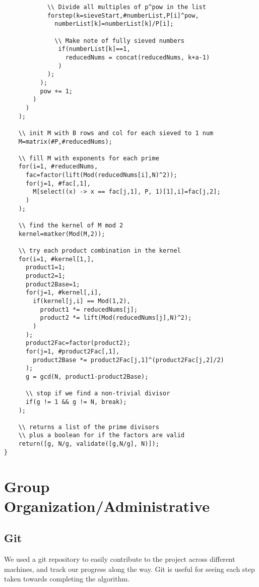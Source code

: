 \documentclass[titlepage]{article}
\begin{document}
\begin{verbatim}
            \\ Divide all multiples of p^pow in the list
            forstep(k=sieveStart,#numberList,P[i]^pow,
              numberList[k]=numberList[k]/P[i];
            
              \\ Make note of fully sieved numbers
               if(numberList[k]==1,
                 reducedNums = concat(reducedNums, k+a-1)
               )
            );
          );
          pow += 1; 
        )
      )
    );
    
    \\ init M with B rows and col for each sieved to 1 num
    M=matrix(#P,#reducedNums);

    \\ fill M with exponents for each prime
    for(i=1, #reducedNums,
      fac=factor(lift(Mod(reducedNums[i],N)^2));
      for(j=1, #fac[,1],
        M[select((x) -> x == fac[j,1], P, 1)[1],i]=fac[j,2];
      )
    );
    
    \\ find the kernel of M mod 2
    kernel=matker(Mod(M,2));

    \\ try each product combination in the kernel
    for(i=1, #kernel[1,],
      product1=1;
      product2=1;
      product2Base=1;
      for(j=1, #kernel[,i],
        if(kernel[j,i] == Mod(1,2),
          product1 *= reducedNums[j];
          product2 *= lift(Mod(reducedNums[j],N)^2);
        )
      );
      product2Fac=factor(product2);
      for(j=1, #product2Fac[,1],
        product2Base *= product2Fac[j,1]^(product2Fac[j,2]/2)
      );
      g = gcd(N, product1-product2Base);

      \\ stop if we find a non-trivial divisor
      if(g != 1 && g != N, break);
    );

    \\ returns a list of the prime divisors 
    \\ plus a boolean for if the factors are valid
    return([g, N/g, validate([g,N/g], N)]);
}
\end{verbatim}
	\section{Group Organization/Administrative}
	
		\subsection{Git}
		We used a git repository to easily contribute to the project across different machines, and track our progress along the way. Git is useful for seeing each step taken towards completing the algorithm.
\end{document}
